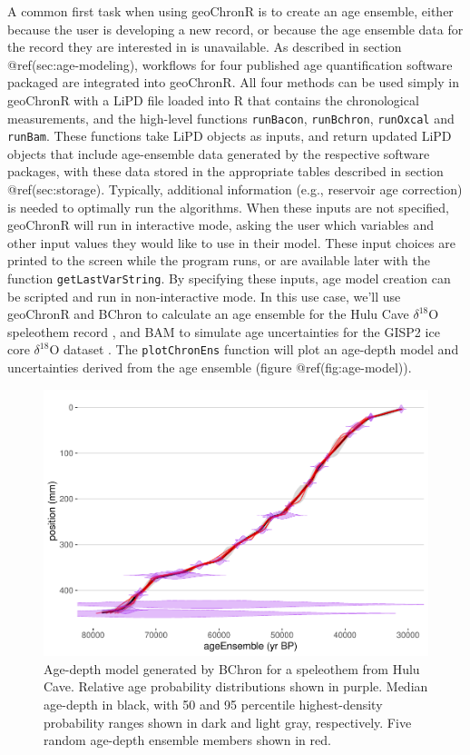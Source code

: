 \documentclass[gchron, manuscript]{copernicus}
\begin{document}
A common first task when using geoChronR is to create an age ensemble,
either because the user is developing a new record, or because the age
ensemble data for the record they are interested in is unavailable. As
described in section @ref(sec:age-modeling), workflows for four
published age quantification software packaged are integrated into
geoChronR. All four methods can be used simply in geoChronR with a LiPD
file loaded into R that contains the chronological measurements, and the
high-level functions \texttt{runBacon}, \texttt{runBchron},
\texttt{runOxcal} and \texttt{runBam}. These functions take LiPD objects
as inputs, and return updated LiPD objects that include age-ensemble
data generated by the respective software packages, with these data
stored in the appropriate tables described in section @ref(sec:storage).
Typically, additional information (e.g., reservoir age correction) is
needed to optimally run the algorithms. When these inputs are not
specified, geoChronR will run in interactive mode, asking the user which
variables and other input values they would like to use in their model.
These input choices are printed to the screen while the program runs, or
are available later with the function \texttt{getLastVarString}. By
specifying these inputs, age model creation can be scripted and run in
non-interactive mode. In this use case, we'll use geoChronR and BChron
\citep{parnell2008flexible} to calculate an age ensemble for the Hulu
Cave \(\delta^{18}\)O speleothem record \citep{hulu2001}, and BAM
\citep{BAM} to simulate age uncertainties for the GISP2 ice core
\(\delta^{18}\)O dataset \citep{alley2000}. The \texttt{plotChronEns}
function will plot an age-depth model and uncertainties derived from the
age ensemble (figure @ref(fig:age-model)).

\begin{figure}
\includegraphics[width=12cm]{geoChronR-paper_files/figure-latex/age-model-1} \caption{Age-depth model generated by BChron for a speleothem from Hulu Cave. Relative age probability distributions shown in purple. Median age-depth in black, with 50 and 95 percentile highest-density probability ranges shown in dark and light gray, respectively. Five random age-depth ensemble members shown in red.}\label{fig:age-model}
\end{figure}
\end{document}
